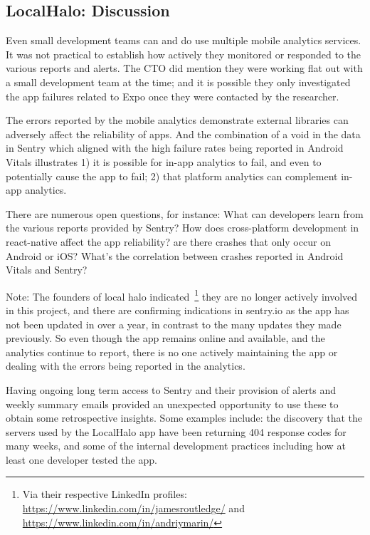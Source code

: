\subsection{LocalHalo: Discussion}
Even small development teams can and do use multiple mobile analytics services. It was not practical to establish how actively they monitored or responded to the various reports and alerts. The CTO did mention they were working flat out with a small development team at the time; and it is possible they only investigated the app failures related to Expo once they were contacted by the researcher.   

The errors reported by the mobile analytics demonstrate external libraries can adversely affect the reliability of apps. And the combination of a void in the data in Sentry which aligned with the high failure rates being reported in Android Vitals illustrates 1) it is possible for in-app analytics to fail, and even to potentially cause the app to fail; 2) that platform analytics can complement in-app analytics.

There are numerous open questions, for instance: What can developers learn from the various reports provided by Sentry? How does cross-platform development in react-native affect the app reliability? are there crashes that only occur on Android or iOS? What's the correlation between crashes reported in Android Vitals and Sentry?

Note: The founders of local halo indicated~\footnote{Via their respective LinkedIn profiles: \url{https://www.linkedin.com/in/jamesroutledge/} and \url{https://www.linkedin.com/in/andriymarin/}} they are no longer actively involved in this project, and there are confirming indications in sentry.io as the app has not been updated in over a year, in contrast to the many updates they made previously. So even though the app remains online and available, and the analytics continue to report, there is no one actively maintaining the app or dealing with the errors being reported in the analytics.


Having ongoing long term access to Sentry and their provision of alerts and weekly summary emails provided an unexpected opportunity to use these to obtain some retrospective insights. Some examples include: the discovery that the servers used by the LocalHalo app have been returning 404 response codes for many weeks, and some of the internal development practices including how at least one developer tested the app.


